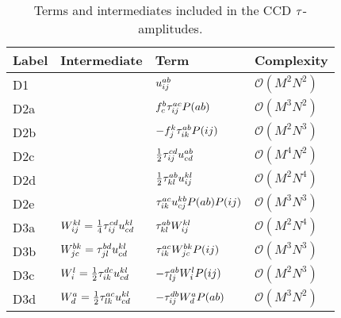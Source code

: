         \begin{table}
            \centering
            \caption{Terms and intermediates included in the CCD
            $\tau$-amplitudes.}
            \renewcommand{\arraystretch}{1.5}
            \begin{tabular}{@{}llll@{}}
                \toprule
                Label & Intermediate & Term & Complexity \\
                \midrule
                D1 & & $u^{ab}_{ij}$ & $\mathcal{O}(M^2 N^2)$ \\
                D2a & & $f^{b}_{c} \tau^{ac}_{ij} P(ab)$
                & $\mathcal{O}(M^3 N^2)$ \\
                D2b & & $-f^{k}_{j} \tau^{ab}_{ik} P(ij)$
                & $\mathcal{O}(M^2 N^3)$ \\
                D2c & & $\frac{1}{2} \tau^{cd}_{ij} u^{ab}_{cd}$
                & $\mathcal{O}(M^4 N^2)$ \\
                D2d & & $\frac{1}{2} \tau^{ab}_{kl} u^{kl}_{ij}$
                & $\mathcal{O}(M^2 N^4)$ \\
                D2e & & $\tau^{ac}_{ik} u^{kb}_{cj} P(ab) P(ij)$
                & $\mathcal{O}(M^3 N^3)$ \\
                D3a
                & $W^{kl}_{ij} = \frac{1}{4} \tau^{cd}_{ij}
                u^{kl}_{cd}$
                & $\tau^{ab}_{kl} W^{kl}_{ij}$
                & $\mathcal{O}(M^2 N^4)$ \\
                D3b
                & $W^{bk}_{jc} = \tau^{bd}_{jl} u^{kl}_{cd}$
                & $\tau^{ac}_{ik} W^{bk}_{jc} P(ij)$
                & $\mathcal{O}(M^3 N^3)$ \\
                D3c
                & $W^{l}_{i} = \frac{1}{2} \tau^{dc}_{ik} u^{kl}_{cd}$
                & $-\tau^{ab}_{lj} W^{l}_{i} P(ij)$
                & $\mathcal{O}(M^2 N^3)$ \\
                D3d
                & $W^{a}_{d} = \frac{1}{2} \tau^{ac}_{lk} u^{kl}_{cd}$
                & $-\tau^{db}_{ij} W^{a}_{d} P(ab)$
                & $\mathcal{O}(M^3 N^2)$ \\
                \bottomrule
            \end{tabular}
            \label{tab:ccd-tau-amplitude-terms}
        \end{table}

